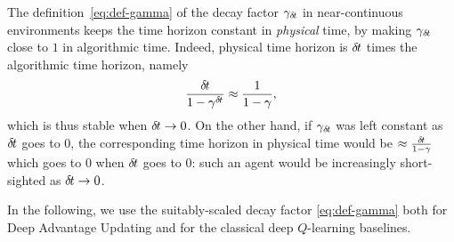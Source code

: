 The definition~\eqref{eq:def-gamma} of the decay factor $\gamma_{\delta\hspace{-.1em}t}$ in
near-continuous environments keeps the time horizon constant in
\emph{physical} time, by making $\gamma_{\delta\hspace{-.1em}t}$ close to $1$ in
algorithmic time. Indeed, physical time horizon is ${\delta\hspace{-.1em}t}$ times the
algorithmic time horizon, namely
\begin{equation}
          \label{eq:time-horizon}
          \frac{{\delta\hspace{-.1em}t}}{1-\gamma^{\delta\hspace{-.1em}t}}
          \approx \frac{1}{1-\gamma},
        \end{equation}
which is thus stable when ${\delta\hspace{-.1em}t}\to 0$. 
On the other hand,
if $\gamma_{\delta\hspace{-.1em}t}$ was left constant
as ${\delta\hspace{-.1em}t}$ goes to $0$, the corresponding time horizon in physical time
would be $\approx \frac{{\delta\hspace{-.1em}t}}{1 - \gamma}$ which goes to $0$ when
${\delta\hspace{-.1em}t}$ goes to $0$: such an agent would be increasingly short-sighted
as ${\delta\hspace{-.1em}t}\to 0$.

In the following, we use the suitably-scaled decay factor
\eqref{eq:def-gamma} both for Deep Advantage Updating and for the
classical deep $Q$-learning baselines.
%       
        


